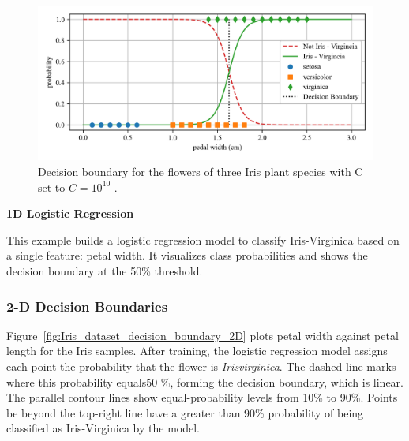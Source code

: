 \documentclass[12pt,letter]{article}
\begin{document}
\begin{figure}[H]
	\centering
	\includegraphics[width=6.2in]{../figures/Iris_dataset_decision_boundary_1D.png}
	\vspace{-3ex}
	\caption{Decision boundary for the flowers of three Iris plant species with C set to $C=10^{10}$ .}
	\label{fig:Iris_dataset_decision_boundary_1D}
\end{figure}

\vspace{-2ex}
\begin{example}
\textbf{1D Logistic Regression}

\noindent This example builds a logistic regression model to classify Iris-Virginica based on a single feature: petal width. It visualizes class probabilities and shows the decision boundary at the 50\% threshold.
\end{example}

	\vspace{-2ex}
\subsubsection{2-D Decision Boundaries}


Figure~\ref{fig:Iris_dataset_decision_boundary_2D} plots petal width against petal length for the Iris samples. After training, the logistic regression model assigns each point the probability that the flower is \textit{Irisvirginica}. The dashed line marks where this probability equals50 \%, forming the decision boundary, which is linear. The parallel contour lines show equal-probability levels from 10\% to 90\%. Points be beyond the top-right line have a greater than 90\% probability  of being classified as Iris-Virginica by the model.
\end{document}
